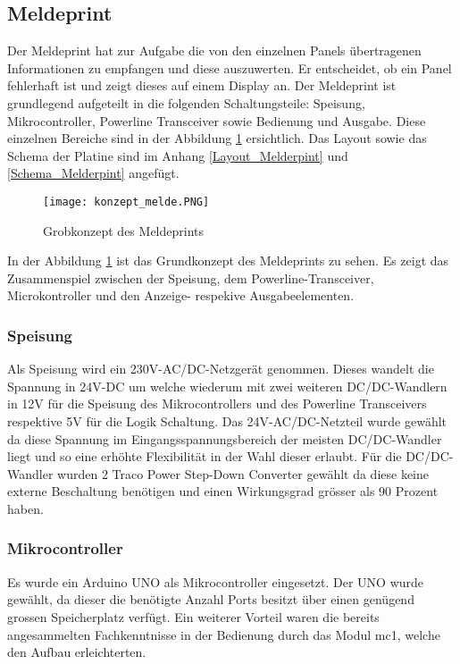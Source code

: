 \subsection{Meldeprint}
Der Meldeprint hat zur Aufgabe die von den einzelnen Panels übertragenen Informationen zu empfangen und diese auszuwerten. Er entscheidet, ob ein Panel fehlerhaft ist und zeigt dieses auf einem Display an. Der Meldeprint ist grundlegend aufgeteilt in die folgenden Schaltungsteile: Speisung, Mikrocontroller, Powerline Transceiver sowie Bedienung und Ausgabe. Diese einzelnen Bereiche sind in der Abbildung \ref{fig::HardKonzept} ersichtlich. Das Layout sowie das Schema der Platine sind im Anhang \ref{Layout_Melderpint} und \ref{Schema_Melderpint} angefügt.

\begin{figure}[h]
	\centering
	\texttt{[image: konzept\_melde.PNG]}
	\caption{Grobkonzept des Meldeprints}
	\label{fig::HardKonzept}	
\end{figure}

In der Abbildung \ref{fig::HardKonzept} ist das Grundkonzept des Meldeprints zu sehen. Es zeigt das Zusammenspiel zwischen der Speisung, dem Powerline-Transceiver, Microkontroller und den Anzeige- respekive Ausgabeelementen.

\subsubsection{Speisung}
Als Speisung wird ein 230V-AC/DC-Netzgerät genommen. Dieses wandelt die Spannung in 24V-DC um welche wiederum mit zwei weiteren DC/DC-Wandlern in 12V für die Speisung des Mikrocontrollers und des Powerline Transceivers respektive 5V für die Logik Schaltung. Das 24V-AC/DC-Netzteil wurde gewählt da diese Spannung im Eingangsspannungsbereich der meisten DC/DC-Wandler liegt und so eine erhöhte Flexibilität in der Wahl dieser erlaubt. Für die DC/DC-Wandler wurden 2 Traco Power Step-Down Converter gewählt da diese keine externe Beschaltung benötigen und einen Wirkungsgrad grösser als 90 Prozent haben.

\subsubsection{Mikrocontroller}
Es wurde ein Arduino UNO als Mikrocontroller eingesetzt. Der UNO wurde gewählt, da dieser die benötigte Anzahl Ports besitzt über einen genügend grossen Speicherplatz verfügt. Ein weiterer Vorteil waren die bereits angesammelten Fachkenntnisse in der Bedienung durch das Modul mc1, welche den Aufbau erleichterten.

